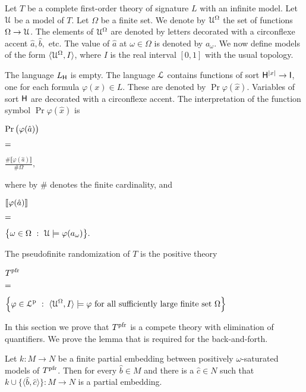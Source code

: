 \documentclass[10pt,oneside]{amsproc}
\begin{document}
\def\ceq#1#2#3{\parbox[t]{25ex}{$\displaystyle #1$}\parbox[t]{6ex}{$\displaystyle\hfil #2$}{$\displaystyle #3$}}

Let $T$ be a complete first-order theory of signature $L$ with an infinite model.
Let ${\EuScript U}$ be a model of $T$.
Let $\Omega$ be a finite set.
We denote by ${\EuScript U}^\Omega$ the set of functions $\Omega\to{\EuScript U}$.
The elements of ${\EuScript U}^\Omega$ are denoted by letters decorated with a circonflexe accent $\hat a,\hat b,$ etc.
The value of $\hat a$ at $\omega\in\Omega$ is denoted by $a_\omega$.
We now define models of the form $\langle{\EuScript U}^\Omega, I\rangle$, where $I$ is the real interval $[0,1]$ with the usual topology.

The language $L_{\sf H}$ is empty.
The language ${\EuScript L}$ contains functions of sort ${\sf H}^{|x|}\to{\sf I}$, one for each formula $\varphi(x)\in L$.
These are denoted by $\Pr\varphi(\hat x)$. 
Variables of sort ${\sf H}$ are decorated with a circonflexe accent.
The interpretation of the function symbol $\Pr\varphi(\hat x)$ is 

\ceq{\hfill\Pr\big(\varphi(\hat a)\big)}
{=}
{\frac{\#\llbracket\varphi(\hat a)\rrbracket}{\#\Omega},}

where by $\#$ denotes the finite cardinality, and

\ceq{\hfill\llbracket\varphi(\hat a)\rrbracket}{=}{\big\{\omega\in\Omega\ :\ {\EuScript U}\models\varphi(a_\omega)\big\}.}

The pseudofinite randomization of $T$ is the positive theory

\ceq{\hfill T^{\rm pfr}}
{=}
{\Big\{\varphi\in{\EuScript L}^{\rm p}\ :\ \langle{\EuScript U}^\Omega, I\rangle\models\varphi\textrm{ for all sufficiently large finite set }\Omega\Big\}}

In this section we prove that $T^{\rm pfr}$ is a compete theory with elimination of quantifiers.
We prove the lemma that is required for the back-and-forth.

\begin{lemma}
  Let $k:M\to N$ be a finite partial embedding between positively $\omega$-saturated models of $T^{\rm pfr}$.
  Then for every $\hat b\in M$ and there is a $\hat c\in N$ such that $k\cup\{\langle\hat b,\hat c\rangle\}:M\to N$ is a partial embedding.
\end{lemma}
\end{document}
